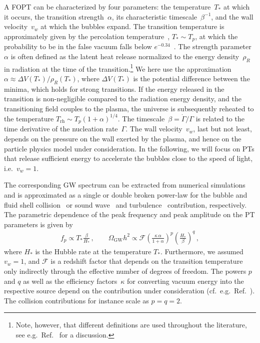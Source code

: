 \documentclass{article}
\newcommand*{\GW}{\ensuremath{\mathrm{GW}}\xspace}
\newcommand*{\Trh}{\ensuremath{T_\mathrm{rh}}\xspace}
\newcommand*{\rhoR}{\ensuremath{\rho_{R}}\xspace}
\begin{document}
A FOPT can be characterized by four parameters: the temperature~$T_*$ at which it occurs, the transition strength~$\alpha$, its characteristic timescale~$\beta^{-1}$, and the wall velocity~$v_w$ at which the bubbles expand.
The transition temperature is approximately given by the percolation temperature~\cite{Athron:2022mmm,Athron:2023xlk}, $T_* \sim T_p$, at which the probability to be in the false vacuum falls below $e^{-0.34}$~\cite{Guth:1982pn}.
The strength parameter~$\alpha$ is often defined as the latent heat release normalized to the energy density~\rhoR in radiation at the time of the transition.\footnote{%
    Note, however, that different definitions are used throughout the literature, see e.g.\ Ref.~\cite{Giese:2020rtr} for a discussion.
}
We here use the approximation $\alpha \approx \Delta V(T_*)/\rhoR(T_*)$, where $\Delta V(T_*)$ is the potential difference between the minima, which holds for strong transitions.
If the energy released in the transition is non-negligible compared to the radiation energy density, and the transitioning field couples to the plasma, the universe is subsequently reheated to the temperature $\Trh \sim T_p (1+\alpha)^{1/4}$.
The timescale~$\beta = \dot{\Gamma}/\Gamma$ is related to the time derivative of the nucleation rate~$\Gamma$. 
The wall velocity~$v_w$, last but not least, depends on the pressure on the wall exerted by the plasma, and hence on the particle physics model under consideration.
In the following, we will focus on PTs that release sufficient energy to accelerate the bubbles close to the speed of light, i.e.\ $v_w=1$. 

The corresponding GW spectrum can be extracted from numerical simulations and is approximated as a single or double broken power-law for the bubble and fluid shell collision~\cite{Lewicki:2020jiv,Ellis:2020nnr,Lewicki:2020azd,Lewicki:2022pdb} or sound wave~\cite{Hindmarsh:2019phv,Jinno:2020eqg,Jinno:2022mie} and turbulence~\cite{Auclair:2022jod,RoperPol:2022iel} contribution, respectively.
The parametric dependence of the peak frequency and peak amplitude on the PT parameters is given by
\begin{align}
    f_p \propto T_* \frac{\beta}{H_*} \,, \qquad \Omega_{\GW}h^2 \propto \mathcal{F} \left(\frac{\kappa\, \alpha}{1+\alpha}\right)^p \left(\frac{H_*}{\beta}\right)^q \,,
    \label{eq:pt_gw_scaling}
\end{align}
where $H_*$ is the Hubble rate at the temperature $T_*$.
Furthermore, we assumed $v_w=1$, and $\mathcal{F}$ is a redshift factor that depends on the transition temperature only indirectly through the effective number of degrees of freedom.
The powers $p$ and $q$ as well as the efficiency factors~$\kappa$ for converting vacuum energy into the respective source depend on the contribution under consideration (cf.\ e.g.\ Ref.~\cite{Breitbach:2018ddu}).
The collision contributions for instance scale as $p=q=2$.
\end{document}
